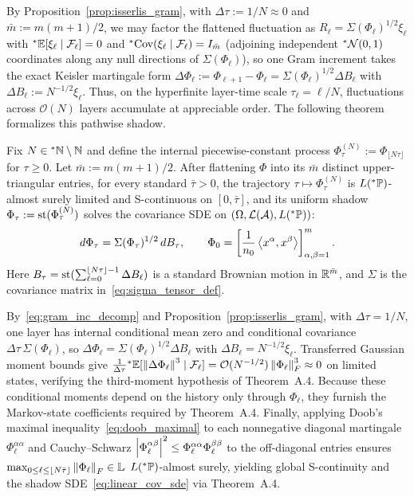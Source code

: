 By Proposition~\ref{prop:isserlis_gram}, with $\Delta\tau := 1/N \approx 0$ and $\bar{m} := m(m+1)/2$, we may factor the flattened fluctuation as $R_\ell = \Sigma(\Phi_\ell)^{1/2}\xi_\ell$ with ${}^*\mathbb{E}[\xi_\ell \mid \mathcal{F}_\ell] = 0$ and ${}^*\!\operatorname{Cov}(\xi_\ell \mid \mathcal{F}_\ell) = I_{\bar{m}}$ (adjoining independent ${}^*\mathcal{N}(0,1)$ coordinates along any null directions of $\Sigma(\Phi_\ell)$), so one Gram increment takes the exact Keisler martingale form $\Delta\Phi_\ell := \Phi_{\ell+1} - \Phi_\ell = \Sigma(\Phi_\ell)^{1/2}\Delta B_\ell$ with $\Delta B_\ell := N^{-1/2}\xi_\ell$. Thus, on the hyperfinite layer-time scale $\tau_\ell = \ell/N$, fluctuations across $\mathcal{O}(N)$ layers accumulate at appreciable order. The following theorem formalizes this pathwise shadow.

\begin{theorem}\label{thm:linear_cov_sde}
Fix $N \in {}^*\mathbb{N} \setminus \mathbb{N}$ and define the internal piecewise-constant process $\Phi_\tau^{(N)} := \Phi_{\lfloor N\tau \rfloor}$ for $\tau \ge 0$. Let $\bar{m} := m(m+1)/2$. After flattening $\Phi$ into its $\bar{m}$ distinct upper-triangular entries, for every standard $\bar{\tau} > 0$, the trajectory $\tau \mapsto \Phi_\tau^{(N)}$ is $L({}^*\mathbb{P})$-almost surely limited and S-continuous on $[0, \bar{\tau}]$, and its uniform shadow $\Phi_\tau := \operatorname{st}(\Phi_\tau^{(N)})$ solves the covariance SDE on $(\Omega, \mathcal{L}(\mathcal{A}), L({}^*\mathbb{P}))$:
\begin{equation}\label{eq:linear_cov_sde}
d\Phi_\tau = \Sigma(\Phi_\tau)^{1/2}\,dB_\tau, \qquad \Phi_0 = \left[\frac{1}{n_0}\left\langle x^\alpha, x^\beta \right\rangle\right]_{\alpha,\beta=1}^m.
\end{equation}
Here $B_\tau = \operatorname{st}(\sum_{\ell=0}^{\lfloor N\tau \rfloor - 1} \Delta B_\ell)$ is a standard Brownian motion in $\mathbb{R}^{\bar{m}}$, and $\Sigma$ is the covariance matrix in~\eqref{eq:sigma_tensor_def}.
\end{theorem}

\begin{proofsketch}
By~\eqref{eq:gram_inc_decomp} and Proposition~\ref{prop:isserlis_gram}, with $\Delta\tau = 1/N$, one layer has internal conditional mean zero and conditional covariance $\Delta\tau\,\Sigma(\Phi_\ell)$, so $\Delta\Phi_\ell = \Sigma(\Phi_\ell)^{1/2}\Delta B_\ell$ with $\Delta B_\ell = N^{-1/2}\xi_\ell$. Transferred Gaussian moment bounds give $\frac{1}{\Delta\tau}{}^*\mathbb{E}[\left\lVert \Delta\Phi_\ell \right\rVert^3 \mid \mathcal{F}_\ell] = \mathcal{O}(N^{-1/2})\left\lVert \Phi_\ell \right\rVert_F^3 \approx 0$ on limited states, verifying the third-moment hypothesis of Theorem~A.4. Because these conditional moments depend on the history only through $\Phi_\ell$, they furnish the Markov-state coefficients required by Theorem~A.4. Finally, applying Doob's maximal inequality~\eqref{eq:doob_maximal} to each nonnegative diagonal martingale $\Phi_\ell^{\alpha\alpha}$ and Cauchy--Schwarz $\left\lvert \Phi_\ell^{\alpha\beta} \right\rvert^2 \le \Phi_\ell^{\alpha\alpha}\Phi_\ell^{\beta\beta}$ to the off-diagonal entries ensures $\max_{0 \le \ell \le \lfloor N\bar{\tau} \rfloor} \left\lVert \Phi_\ell \right\rVert_F \in \mathbb{L}$ $L({}^*\mathbb{P})$-almost surely, yielding global S-continuity and the shadow SDE~\eqref{eq:linear_cov_sde} via Theorem~A.4.
\end{proofsketch}

